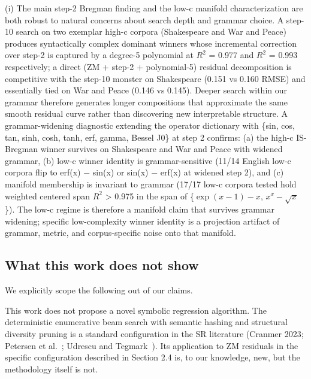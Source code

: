 \documentclass[11pt]{article}
\begin{document}
(i) The main step-2 Bregman finding and the low-c manifold characterization are both robust to natural concerns about search depth and grammar choice. A step-10 search on two exemplar high-c corpora (Shakespeare and War and Peace) produces syntactically complex dominant winners whose incremental correction over step-2 is captured by a degree-5 polynomial at $R^2$ = 0.977 and $R^2$ = 0.993 respectively; a direct (ZM + step-2 + polynomial-5) residual decomposition is competitive with the step-10 monster on Shakespeare (0.151 vs 0.160 RMSE) and essentially tied on War and Peace (0.146 vs 0.145). Deeper search within our grammar therefore generates longer compositions that approximate the same smooth residual curve rather than discovering new interpretable structure. A grammar-widening diagnostic extending the operator dictionary with \{sin, cos, tan, sinh, cosh, tanh, erf, gamma, Bessel J0\} at step 2 confirms: (a) the high-c IS-Bregman winner survives on Shakespeare and War and Peace with widened grammar, (b) low-c winner identity is grammar-sensitive (11/14 English low-c corpora flip to erf(x) − sin(x) or sin(x) − erf(x) at widened step 2), and (c) manifold membership is invariant to grammar (17/17 low-c corpora tested hold weighted centered span $R^2$ > 0.975 in the span of \{$\exp(x-1)-x$, $x^x-\sqrt{x}$\}). The low-c regime is therefore a manifold claim that survives grammar widening; specific low-complexity winner identity is a projection artifact of grammar, metric, and corpus-specific noise onto that manifold.

\subsection{What this work does not show}

We explicitly scope the following out of our claims.

This work does not propose a novel symbolic regression algorithm. The deterministic enumerative beam search with semantic hashing and structural diversity pruning is a standard configuration in the SR literature (Cranmer 2023; Petersen et al.~\cite{petersen2020}; Udrescu and Tegmark~\cite{udrescu2020}). Its application to ZM residuals in the specific configuration described in Section 2.4 is, to our knowledge, new, but the methodology itself is not.
\end{document}
